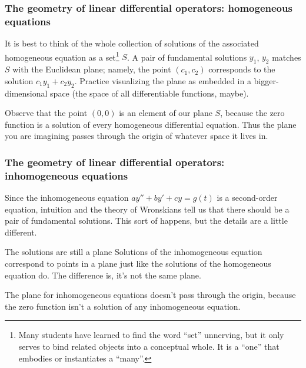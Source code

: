 \begin{frame}

\frametitle{The geometry of linear differential operators: homogeneous equations}
\label{thegeometryoflineardifferentialoperators:homogeneousequations}

It is best to think of the whole collection of solutions of the associated homogeneous equation as a set\footnote{Many students have learned to find the word ``set'' unnerving, but it only serves to bind related objects into a conceptual whole. It is a ``one'' that embodies or instantiates a ``many''.} $ S $. A pair of fundamental solutions $ y_1 $, $ y_2 $ matches $ S $ with the Euclidean plane; namely, the point $ (c_1, c_2) $ corresponds to the solution $ c_1 y_1 + c_2 y_2 $. Practice visualizing the plane as embedded in a bigger-dimensional space (the space of all differentiable functions, maybe).

Observe that the point $ (0,0) $ is an element of our plane $ S $, because the zero function is a solution of every homogeneous differential equation. Thus the plane you are imagining passes through the origin of whatever space it lives in.

\end{frame}

\begin{frame}

\frametitle{The geometry of linear differential operators: inhomogeneous equations}
\label{thegeometryoflineardifferentialoperators:inhomogeneousequations}

Since the inhomogeneous equation $ ay'' + by' + cy = g(t) $ is a second-order equation, intuition and the theory of Wronskians tell us that there should be a pair of fundamental solutions. This sort of happens, but the details are a little different.

\begin{block}{The solutions are still a plane}
Solutions of the inhomogeneous equation correspond to points in a plane just like the solutions of the homogeneous equation do. The difference is, it's not the same plane.
\end{block}

The plane for inhomogeneous equations doesn't pass through the origin, because the zero function isn't a solution of any inhomogeneous equation.

\end{frame}

